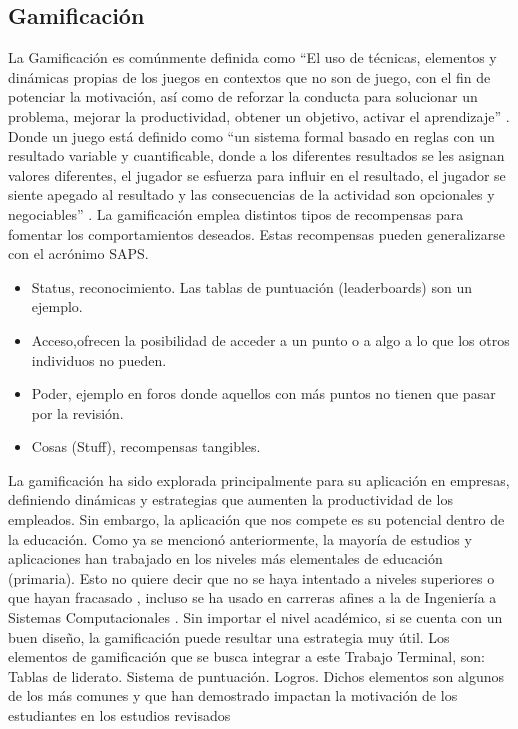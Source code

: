 \documentclass{article}
\begin{document}
\subsection{Gamificación}
La Gamificación es comúnmente definida como “El uso de técnicas, elementos y dinámicas propias de los juegos en contextos que no son de juego, con el fin de potenciar la motivación, así como de reforzar la conducta para solucionar un problema, mejorar la productividad, obtener un objetivo, activar el aprendizaje” \cite{robson2015all}. Donde un juego está definido como “un sistema formal basado en reglas con un resultado variable y cuantificable, donde a los diferentes resultados se les asignan valores diferentes, el jugador se esfuerza para influir en el resultado, el jugador se siente apegado al resultado y las consecuencias de la actividad son opcionales y negociables” \cite{zichermann2011gamification}.
La gamificación emplea distintos tipos de recompensas para fomentar los comportamientos deseados. Estas recompensas pueden generalizarse con el acrónimo SAPS.
\begin{itemize}
	\item Status, reconocimiento. Las tablas de puntuación (leaderboards) son un ejemplo.
	\item Acceso,ofrecen la posibilidad de acceder a un punto o a algo a lo que los otros individuos no pueden.
	\item Poder, ejemplo en foros donde aquellos con más puntos no tienen que pasar por la revisión.
	\item Cosas (Stuff), recompensas tangibles. 
\end{itemize}

La gamificación ha sido explorada principalmente para su aplicación en empresas, definiendo dinámicas y estrategias que aumenten la productividad de los empleados. Sin embargo, la aplicación que nos compete es su potencial dentro de la educación. Como ya se mencionó anteriormente, la mayoría de estudios y aplicaciones han trabajado en los niveles más elementales de educación (primaria)\cite{rodrigues2017math}. Esto no quiere decir que no se haya intentado a niveles superiores o que hayan fracasado \cite{wiggins2016overview,sanchez2017classcraft,tan2018}, incluso se ha usado
en carreras afines a la de Ingeniería a Sistemas Computacionales \cite{ibanez2014gamification}. Sin importar el nivel académico, si
se cuenta con un buen diseño, la gamificación puede resultar una estrategia muy útil. Los elementos de
gamificación que se busca integrar a este Trabajo Terminal, son:
Tablas de liderato.
Sistema de puntuación.
Logros.
Dichos elementos son algunos de los más comunes y que han demostrado impactan la motivación de los
estudiantes en los estudios revisados \cite{wiggins2016overview,sanchez2017classcraft,ibanez2014gamification,tan2018}
\end{document}
